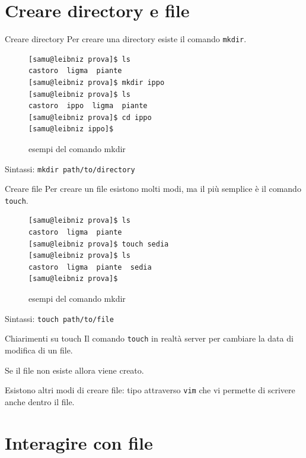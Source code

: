 \documentclass{beamer}
\begin{document}
\section{Creare directory e file}
\begin{frame}[fragile]{Creare directory}
  Per creare una directory esiste il comando \texttt{mkdir}.
  \begin{figure}
    \begin{lstlisting}[basicstyle=\small]
[samu@leibniz prova]$ ls
castoro  ligma  piante
[samu@leibniz prova]$ mkdir ippo
[samu@leibniz prova]$ ls
castoro  ippo  ligma  piante
[samu@leibniz prova]$ cd ippo
[samu@leibniz ippo]$
    \end{lstlisting}
    \caption{esempi del comando mkdir}
  \end{figure}

  Sintassi: \texttt{mkdir path/to/directory}
\end{frame}

\begin{frame}[fragile]{Creare file}
  Per creare un file esistono molti modi, ma il più semplice è il comando 
  \texttt{touch}.
  \begin{figure}
    \begin{lstlisting}[basicstyle=\small]
[samu@leibniz prova]$ ls
castoro  ligma  piante
[samu@leibniz prova]$ touch sedia
[samu@leibniz prova]$ ls
castoro  ligma  piante  sedia
[samu@leibniz prova]$
    \end{lstlisting}
    \caption{esempi del comando mkdir}
  \end{figure}

  Sintassi: \texttt{touch path/to/file}
\end{frame}

\begin{frame}{Chiarimenti su touch}
  Il comando \texttt{touch} in realtà server per cambiare la data di modifica di 
  un file.\bigskip

  Se il file non esiste allora viene creato.\bigskip

  Esistono altri modi di creare file: tipo attraverso \texttt{vim} che vi 
    permette di scrivere anche dentro il file.\bigskip
\end{frame}

\section{Interagire con file}
\end{document}

